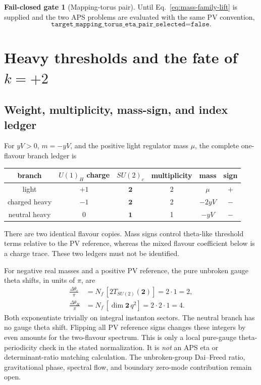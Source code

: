 \documentclass[11pt]{article}
\theoremstyle{definition}
\newtheorem{gate}[theorem]{Fail-closed gate}
\theoremstyle{remark}
\begin{document}
\begin{gate}[Mapping-torus pair]
Until Eq.~\eqref{eq:mass-family-lift} is supplied and the two APS problems
are evaluated with the same PV convention,
\begin{equation}
 \texttt{target\_mapping\_torus\_eta\_pair\_selected=false}.
 \label{eq:target-pair-false}
\end{equation}
\end{gate}

\section{Heavy thresholds and the fate of
\texorpdfstring{\(k=+2\)}{k=+2}}

\subsection{Weight, multiplicity, mass-sign, and index ledger}

For \(yV>0\), \(m=-yV\), and the positive light regulator mass \(\mu\),
the complete one-flavour branch ledger is
\begin{center}
\begin{tabular}{cccccc}
\toprule
branch & \(U(1)_H\) charge & \(SU(2)_c\) & multiplicity & mass & sign\\
\midrule
light & \(+1\) & \(\bm2\) & 2 & \(\mu\) & \(+\)\\
charged heavy & \(-1\) & \(\bm2\) & 2 & \(-2yV\) & \(-\)\\
neutral heavy & \(0\) & \(\bm1\) & 1 & \(-yV\) & \(-\)\\
\bottomrule
\end{tabular}
\end{center}
There are two identical flavour copies.  Mass signs control theta-like
threshold terms relative to the PV reference, whereas the mixed flavour
coefficient below is a charge trace.  These two ledgers must not be
identified.

For negative real masses and a positive PV reference, the pure unbroken
gauge theta shifts, in units of \(\pi\), are
\begin{align}
 \frac{\Delta\theta_c}{\pi}
 &=N_f\,[2T_{SU(2)}(\bm2)]=2\cdot1=2,
 \label{eq:theta-c}\\
 \frac{\Delta\theta_H}{\pi}
 &=N_f\,[\dim\bm2\,q^2]=2\cdot2\cdot1=4.
 \label{eq:theta-h}
\end{align}
Both exponentiate trivially on integral instanton sectors.  The neutral
branch has no gauge theta shift.  Flipping all PV reference signs changes
these integers by even amounts for the two-flavour spectrum.  This is only
a local pure-gauge theta-periodicity check in the stated normalization.  It
is \emph{not} an APS eta or determinant-ratio matching calculation.  The
unbroken-group Dai--Freed ratio, gravitational phase, spectral flow, and
boundary zero-mode contribution remain open.
\end{document}
